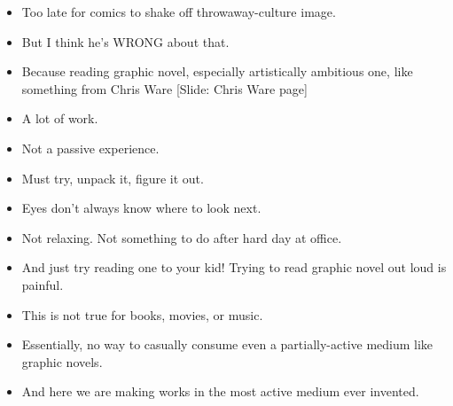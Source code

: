 \documentclass[12pt]{article}
\begin{document}
{\begin{itemize}
\item Too late for comics to shake off throwaway-culture image.

\item But I think he's WRONG about that.


\item Because reading graphic novel, especially artistically ambitious one, like something from Chris Ware [Slide: Chris Ware page]

\item A lot of work.  

\item Not a passive experience.  

\item Must try, unpack it, figure it out.  

\item Eyes don't always know where to look next.

\item Not relaxing.  Not something to do after hard day at office.  

\item And just try reading one to your kid!  Trying to read graphic novel out loud is painful.

\item This is not true for books, movies, or music.

\item Essentially, no way to casually consume even a partially-active medium like graphic novels.

\item And here we are making works in the most active medium ever invented.









\end{itemize}
}
\end{document}
